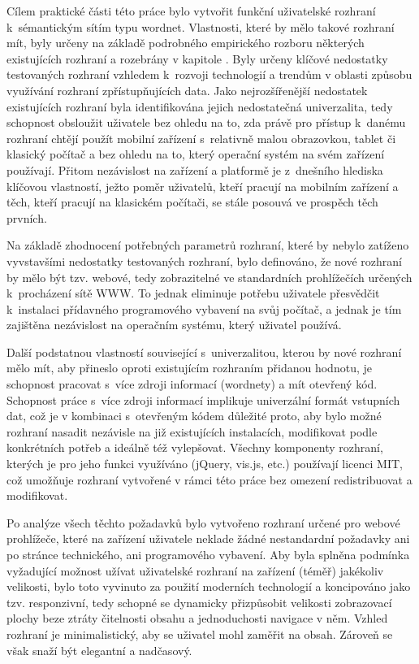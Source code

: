 \documentclass[a4paper, 11pt, oneside, showtrims]{book}
\newcommand{\itNameRef}[1]{\textit{\nameref{#1}}}
\begin{document}

			Cílem praktické části této práce bylo vytvořit funkční uživatelské rozhraní k~sémantickým sítím typu wordnet. Vlastnosti, které by mělo takové rozhraní mít, byly určeny na základě podrobného empirického rozboru některých existujících rozhraní a rozebrány v kapitole \itNameRef{cha:navrh}. Byly určeny klíčové nedostatky testovaných rozhraní vzhledem k~rozvoji technologií a trendům v oblasti způsobu využívání rozhraní zpřístupňujících data. Jako nejrozšířenější nedostatek existujících rozhraní byla identifikována jejich nedostatečná univerzalita, tedy schopnost obsloužit uživatele bez ohledu na to, zda právě pro přístup k~danému rozhraní chtějí použít mobilní zařízení s~relativně malou obrazovkou, tablet či klasický počítač a bez ohledu na to, který operační systém na svém zařízení používají. Přitom nezávislost na zařízení a platformě je z~dnešního hlediska klíčovou vlastností, ježto poměr uživatelů, kteří pracují na mobilním zařízení a těch, kteří pracují na klasickém počítači, se stále posouvá ve prospěch těch prvních.

			Na základě zhodnocení potřebných parametrů rozhraní, které by nebylo zatíženo vyvstavšími nedostatky testovaných rozhraní, bylo definováno, že nové rozhraní by mělo být tzv. webové, tedy zobrazitelné ve standardních prohlížečích určených k~procházení sítě WWW. To jednak eliminuje potřebu uživatele přesvědčit k~instalaci přídavného programového vybavení na svůj počítač, a jednak je tím zajištěna nezávislost na operačním systému, který uživatel používá. 

			Další podstatnou vlastností související s~univerzalitou, kterou by nové rozhraní mělo mít, aby přineslo oproti existujícím rozhraním přidanou hodnotu, je schopnost pracovat s~více zdroji informací (wordnety) a mít otevřený kód. Schopnost práce s~více zdroji informací implikuje univerzální formát vstupních dat, což je v kombinaci s~otevřeným kódem důležité proto, aby bylo možné rozhraní nasadit nezávisle na již existujících instalacích, modifikovat podle konkrétních potřeb a ideálně též vylepšovat. Všechny komponenty rozhraní, kterých je pro jeho funkci využíváno (jQuery, vis.js, etc.) používají licenci MIT, což umožňuje rozhraní vytvořené v rámci této práce bez omezení redistribuovat a modifikovat. 

			Po analýze všech těchto požadavků bylo vytvořeno rozhraní určené pro webové prohlížeče, které na zařízení uživatele neklade žádné nestandardní požadavky ani po stránce technického, ani programového vybavení. Aby byla splněna podmínka vyžadující možnost užívat uživatelské rozhraní na zařízení (téměř) jakékoliv velikosti, bylo toto vyvinuto za použití moderních technologií a koncipováno jako tzv. responzivní, tedy schopné se dynamicky přizpůsobit velikosti zobrazovací plochy beze ztráty čitelnosti obsahu a jednoduchosti navigace v něm. Vzhled rozhraní je minimalistický, aby se uživatel mohl zaměřit na obsah. Zároveň se však snaží být elegantní a nadčasový.
\end{document}
